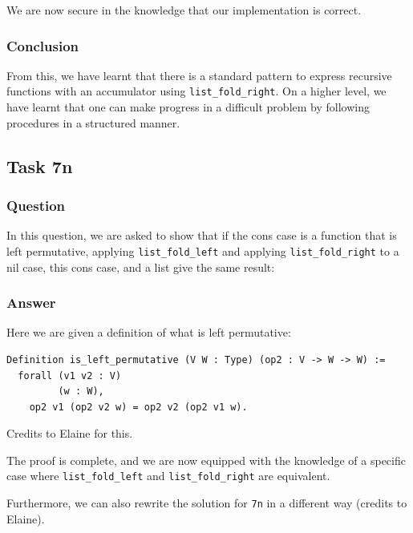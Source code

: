 \documentclass{article}
\begin{document}
We are now secure in the knowledge that our implementation is correct.

\subsubsection{Conclusion}
From this, we have learnt that there is a standard pattern to express recursive functions with an accumulator using \texttt{list\_fold\_right}. On a higher level, we have learnt that one can make progress in a difficult problem by following procedures in a structured manner. 

\subsection{Task 7n}

\subsubsection{Question}
In this question, we are asked to show that if the cons case is a function that is left permutative, applying  \texttt{list\_fold\_left} and applying \texttt{list\_fold\_right} to a nil case, this cons case, and a list give the same result:

\subsubsection{Answer}
Here we are given a definition of what is left permutative:

\begin{lstlisting}
Definition is_left_permutative (V W : Type) (op2 : V -> W -> W) :=
  forall (v1 v2 : V)
         (w : W),
    op2 v1 (op2 v2 w) = op2 v2 (op2 v1 w).
\end{lstlisting}

Credits to Elaine for this.

The proof is complete, and we are now equipped with the knowledge of a specific case where \texttt{list\_fold\_left} and \texttt{list\_fold\_right} are equivalent. 

Furthermore, we can also rewrite the solution for \texttt{7n} in a different way (credits to Elaine).
\end{document}
